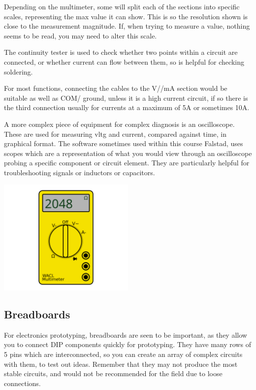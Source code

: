 \documentclass[a4paper,11pt]{report}
\begin{document}
Depending on the multimeter, some will split each of the sections into specific scales, representing the max value it can show. This is so the resolution shown is close to the measurement magnitude. If, when trying to measure a value, nothing seems to be read, you may need to alter this scale.

The continuity tester is used to check whether two points within a circuit are connected, or whether current can flow between them, so is helpful for checking soldering.

For most functions, connecting the cables to the V/\ohm/mA section would be suitable as well as COM/ ground, unless it is a high current circuit, if so there is the third connection usually for currents at a maximum of 5A or sometimes 10A.

A more complex piece of equipment for complex diagnosis is an oscilloscope. These are used for measuring \gls{vltg} and current, compared against time, in graphical format. The software sometimes used within this course Falstad, uses scopes which are a representation of what you would view through an oscilloscope probing a specific component or circuit element. They are particularly helpful for troubleshooting signals or inductors or capacitors.

\includegraphics[width=0.5\textwidth]{multimeter1}

\subsection{Breadboards}

For electronics prototyping, breadboards are seen to be important, as they allow you to connect DIP components quickly for prototyping. They have many rows of 5 pins which are interconnected, so you can create an array of complex circuits with them, to test out ideas. Remember that they may not produce the most stable circuits, and would not be recommended for the field due to loose connections.
\end{document}
